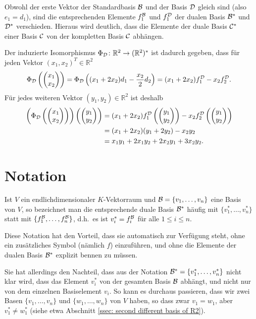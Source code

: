 \documentclass[a4paper,10pt]{article}
\begin{document}
Obwohl der erste Vektor der Standardbasis $\mathcal{B}$ und der Basis $\mathcal{D}$ gleich sind (also $e_1 = d_1$), sind die entsprechenden Elemente $f^{\mathcal{B}}_1$ und $f^{\mathcal{D}}_1$ der dualen Basis $\mathcal{B}^*$ und $\mathcal{D}^*$ verschieden. Hieraus wird deutlich, dass die Elemente der duale Basis $\mathcal{C}^*$ einer Basis $\mathcal{C}$ von der kompletten Basis $\mathcal{C}$ abhängen.

Der induzierte Isomorphismus $\Phi_{\mathcal{D}} \colon \mathbb{R}^2 \to (\mathbb{R}^2)^*$ ist dadurch gegeben, dass für jeden Vektor $(x_1, x_2)^T \in \mathbb{R}^2$
\[
 \Phi_{\mathcal{D}}\left(\begin{pmatrix} x_1 \\ x_2 \end{pmatrix}\right)
 = \Phi_{\mathcal{D}}\left( (x_1 + 2 x_2) d_1 - \frac{x_2}{2} d_2 \right)
 = (x_1 + 2 x_2) f^{\mathcal{D}}_1 - x_2 f^{\mathcal{D}}_2.
\]
Für jedes weiteren Vektor $(y_1, y_2) \in \mathbb{R}^2$ ist deshalb
\begin{align*}
 \left( \Phi_{\mathcal{D}}\left(\begin{pmatrix} x_1 \\ x_2 \end{pmatrix}\right) \right)\left( \begin{pmatrix} y_1 \\ y_2 \end{pmatrix} \right)
 &= (x_1 + 2 x_2) f^{\mathcal{D}}_1\left( \begin{pmatrix} y_1 \\ y_2 \end{pmatrix} \right) - x_2 f^{\mathcal{D}}_2\left( \begin{pmatrix} y_1 \\ y_2 \end{pmatrix} \right) \\
 &= (x_1 + 2 x_2) (y_1 + 2 y_2) - x_2 y_2 \\
 &= x_1 y_1 + 2 x_1 y_2 + 2 x_2 y_1 + 3 x_2 y_2.
\end{align*}











\section{Notation}
Ist $V$ ein endlichdimensionaler $K$-Vektorraum und $\mathcal{B} = \{v_1, \dotsc, v_n\}$ eine Basis von $V$, so bezeichnet man die entsprechende duale Basis $\mathcal{B}^*$ häufig mit $\{v_1^*, \dotsc, v_n^*\}$ statt mit $\{f^{\mathcal{B}}_1, \dotsc, f^{\mathcal{B}}_n\}$, d.h.\ es ist $v_i^* = f^{\mathcal{B}}_i$ für alle $1 \leq i \leq n$.

Diese Notation hat den Vorteil, dass sie automatisch zur Verfügung steht, ohne ein zusätzliches Symbol (nämlich $f$) einzuführen, und ohne die Elemente der dualen Basis $\mathcal{B}^*$ explizit bennen zu müssen.

Sie hat allerdings den Nachteil, dass aus der Notation $\mathcal{B}^* = \{v_1^*, \dotsc, v_n^*\}$ nicht klar wird, dass das Element $v_i^*$ von der gesamten Basis $\mathcal{B}$ abhängt, und nicht nur von dem einzelnen Basiselement $v_i$. So kann es durchaus passieren, dass wir zwei Basen $\{v_1, \dotsc, v_n\}$ und $\{w_1, \dotsc, w_n\}$ von $V$ haben, so dass zwar $v_1 = w_1$, aber $v_1^* \neq w_1^*$ (siehe etwa Abschnitt \ref{ssec: second different basis of R2}).
\end{document}
